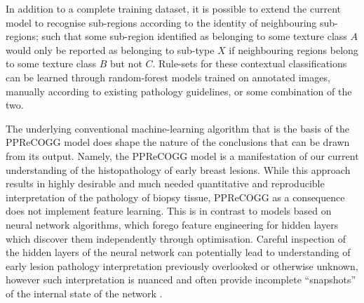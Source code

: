 In addition to a complete training dataset, it is possible to extend the current model to recognise sub-regions according to the identity of neighbouring sub-regions; such that some sub-region identified as belonging to some texture class $A$ would only be reported as belonging to sub-type $X$ if neighbouring regions belong to some texture class $B$ but not $C$. Rule-sets for these contextual classifications can be learned through random-forest models trained on annotated images, manually according to existing pathology guidelines, or some combination of the two. \par

The underlying conventional machine-learning algorithm that is the basis of the \mbox{PPReCOGG} model does shape the nature of the conclusions that can be drawn from its output. Namely, the PPReCOGG model is a manifestation of our current understanding of the histopathology of early breast lesions. While this approach results in highly desirable and much needed quantitative and reproducible interpretation of the pathology of biopsy tissue, PPReCOGG as a consequence does not implement feature learning. This is in contrast to models based on neural network algorithms, which forego feature engineering for hidden layers which discover them independently through optimisation. Careful inspection of the hidden layers of the neural network can potentially lead to understanding of early lesion pathology interpretation previously overlooked or otherwise unknown, however such interpretation is nuanced and often provide incomplete ``snapshots'' of the internal state of the network \citep{erhan2010, zeiler2013}.\par


